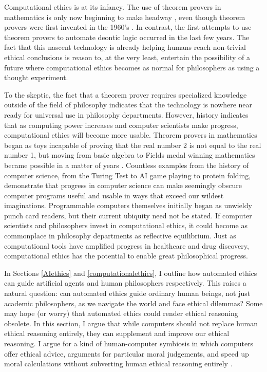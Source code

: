 \begin{isabellebody}
\begin{isamarkuptext}
Computational ethics is at its infancy. The use of theorem provers in mathematics is only now beginning 
to make headway \citep{buzzardvideo}, even though theorem provers were first invented in the 1960's \citep{historyofITP}. 
In contrast, the first attempts to use theorem provers to automate deontic logic occurred in the last
few years. The 
fact that this nascent technology is already helping humans reach non-trivial ethical conclusions 
is reason to, at the very least, entertain the possibility of a future where computational ethics 
becomes as normal for philosophers as using a thought experiment.

To the skeptic, the fact that a theorem prover requires specialized knowledge outside of the field 
of philosophy indicates that the technology is nowhere near ready for universal use in philosophy 
departments. However, history indicates that as computing power increases and computer scientists make 
progress, computational ethics will become more usable. Theorem provers in mathematics began as toys 
incapable of proving that the real number 2 is not equal to the real number 1, but 
moving from basic algebra to Fields medal winning mathematics became possible in a
matter of years \citep{buzzardvideo}. Countless examples from the history of computer science, from the Turing 
Test to AI game playing to protein folding, demonstrate that progress in computer science can make seemingly 
obscure computer programs useful and usable in ways that exceed our wildest imaginations.
Programmable computers themselves initially began as unwieldy punch card readers, but their current ubiquity 
need not be stated. If computer scientists and philosophers invest in computational ethics, it could
become as commonplace in philosophy departments as reflective equilibrium. Just as computational tools
have amplified progress in healthcare and drug discovery, computational ethics has the potential to enable
great philosophical progress.%
\end{isamarkuptext}\isamarkuptrue%
%
\isadelimdocument
%
\endisadelimdocument
%
\isatagdocument
%
\isamarkuptrue%
%
\endisatagdocument
{\isafolddocument}%
%
\isadelimdocument
%
\endisadelimdocument
%
\begin{isamarkuptext}%
In Sections \ref{AIethics} and \ref{computationalethics}, I outline how automated ethics can guide
artificial agents and human philosophers respectively. This raises a natural question: can automated
ethics guide ordinary human beings, not just academic philosophers, as we navigate the world and face ethical
dilemmas? Some may hope (or worry) that automated ethics could render ethical reasoning obsolete. In 
this section, I argue that while computers should not replace human ethical reasoning entirely,
they can supplement and improve our ethical reasoning. I argue for a kind of human-computer symbiosis
in which computers offer ethical advice, arguments for particular moral judgements, and speed up moral
calculations without subverting human ethical reasoning entirely \citep{licklider}.


\end{isamarkuptext}
\end{isabellebody}
